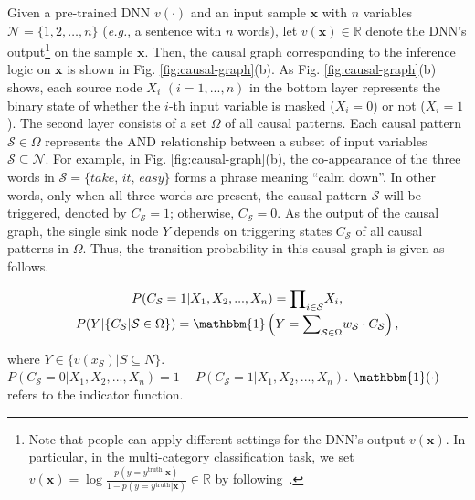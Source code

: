 Given a pre-trained DNN {\small$v(\cdot)$} and an input sample {\small$\boldsymbol{x}$} with {\small$n$} variables {\small$\mathcal{N}=\{1,2,\ldots,n\}$} (\emph{e.g.}, a sentence with {\small$n$} words), let {\small$v(\boldsymbol{x})\in\mathbb{R}$} denote the DNN's output\footnote{Note that people can apply different settings for the DNN's output {\scriptsize$v(\boldsymbol{x})$}. In particular, in the multi-category classification task, we set {\scriptsize$v(\boldsymbol{x})=\log\frac{p(y=y^{\text{truth}}|\boldsymbol{x})}{1-p(y=y^{\text{truth}}|\boldsymbol{x})}\in\mathbb{R}$} by following~\cite{deng2022discovering}.\label{footnote:v-S}} on the sample {\small$\boldsymbol{x}$}. Then, the causal graph corresponding to the inference logic on {\small$\boldsymbol{x}$} is shown in Fig. \ref{fig:causal-graph}(b).
As Fig. \ref{fig:causal-graph}(b) shows, each source node {\small$X_i$} {\small$(i=1,...,n)$} in the bottom layer represents the binary state of whether the {\small$i$}-th input variable is masked ({\small$X_i=0$}) or not ({\small$X_i=1$}).
The second layer consists of a set {\small$\Omega$} of all causal patterns. Each causal pattern {\small$\mathcal{S}\in\Omega$} represents the AND relationship between a subset of input variables {\small$\mathcal{S}\!\subseteq\!\mathcal{N}$}.
For example, in Fig. \ref{fig:causal-graph}(b), the co-appearance of the three words in {\small$\mathcal{S}=\{\textit{take, it, easy}\}$} forms a phrase meaning ``calm down''.
In other words, only when all three words are present, the causal pattern {\small$\mathcal{S}$} will be triggered, denoted by {\small$C_{\mathcal{S}}=1$}; otherwise, {\small$C_{\mathcal{S}}=0$}.
As the output of the causal graph, the single sink node {\small$Y$} depends on triggering states {\small$C_{\mathcal{S}}$} of all causal patterns in  {\small$\Omega$}.
Thus, the transition probability in this causal graph is given as follows.

\begin{small}
\begin{equation}
\begin{gathered}
    P(C_{\mathcal{S}}=1|X_1,X_2,...,X_n)={\prod}_{i\in\mathcal{S}} X_i,
    \\[-2pt]
    P(Y|\{C_{\mathcal{S}}|\mathcal{S}\in\Omega\})=\mathbbm{1}\left(Y={\sum}_{\mathcal{S}\in\Omega}  w_{\mathcal{S}}\cdot C_{\mathcal{S}}\right),
    \label{eq:transition-probability}
\end{gathered}
\end{equation}
\end{small}
\!\!where {\small$Y\in\{v(x_S)|S\subseteq N\}$}.
{\small$P(C_{\mathcal{S}}\!=\!0|X_1,X_2,...,X_n)\!=\!1\!-\!P(C_{\mathcal{S}}\!=\!1|X_1,X_2,...,X_n)$}.
{\small$\mathbbm{1}(\cdot)$} refers to the indicator function.

